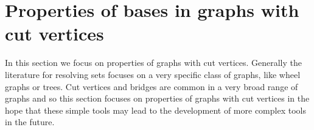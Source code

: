 \documentclass[11pt]{amsart}
\theoremstyle{plain}  %
\newtheorem{lem}[thm]{Lemma}
\theoremstyle{definition}
\theoremstyle{remark}
\numberwithin{equation}{thm}
\begin{document}
\section{Properties of bases in graphs with cut vertices}
In this section we focus on properties of graphs with cut vertices. 
Generally the literature for resolving sets focuses on a very specific class of graphs, like wheel graphs or trees.
Cut vertices and bridges are common in a very broad range of graphs and so this section focuses on properties of graphs
with cut vertices in the hope that these simple tools may lead to the development of more complex tools in the future.


 
\end{document}
